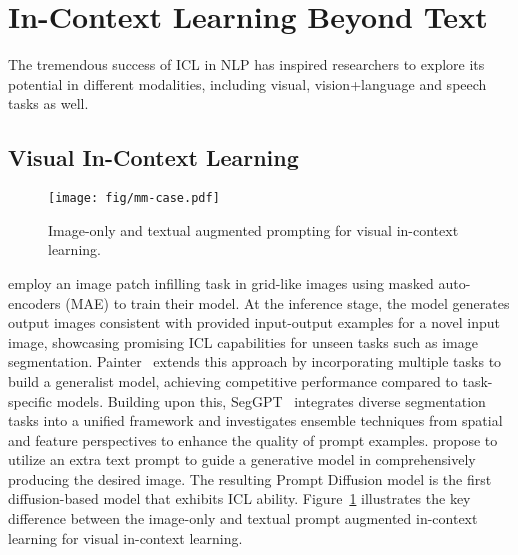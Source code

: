 \section{In-Context Learning Beyond Text}
\label{sec:mm_icl}

The tremendous success of ICL in NLP  has inspired researchers to explore its potential in different modalities, including visual, vision+language and speech tasks as well. 

\subsection{Visual In-Context Learning}
\begin{figure}
    \centering
    \texttt{[image: fig/mm-case.pdf]}
    \caption{Image-only and textual augmented prompting for visual in-context learning.}
    \label{fig:mm_case}
\end{figure}
\citet{bar2022visual_icl} employ an image patch infilling task in grid-like images using masked auto-encoders (MAE) to train their model. 
At the inference stage, the model generates output images consistent with provided input-output examples for a novel input image, showcasing promising ICL capabilities for unseen tasks such as image segmentation. Painter~\citep{wang2023imagesPainter} extends this approach by incorporating multiple tasks to build a generalist model, achieving competitive performance compared to task-specific models. Building upon this, SegGPT~\citep{wang2023seggpt} integrates diverse segmentation tasks into a unified framework and investigates ensemble techniques from spatial and feature perspectives to enhance the quality of prompt examples.
\citet{wang2023prompt_diffusion} propose to utilize an extra text prompt to guide a generative model in comprehensively producing the desired image. The resulting Prompt Diffusion model is the first diffusion-based model that exhibits ICL ability. 
Figure~\ref{fig:mm_case} illustrates the key difference between the image-only and textual prompt augmented in-context learning for visual in-context learning.
